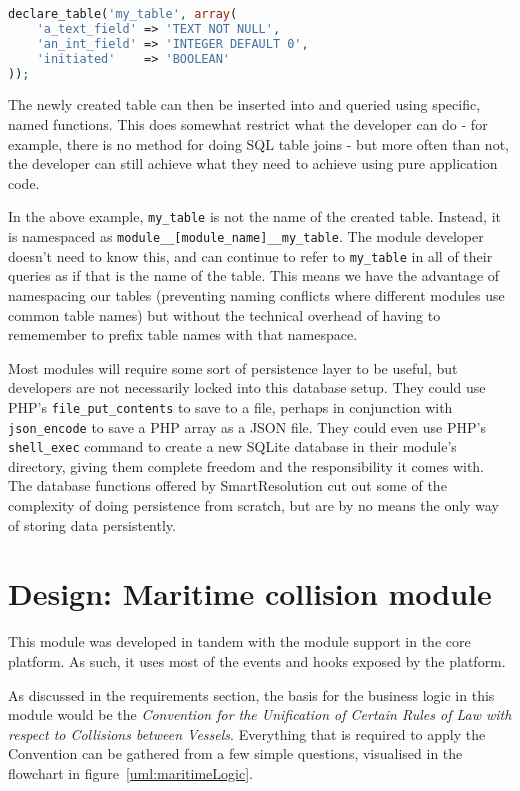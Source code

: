 \begin{lstlisting}[language=php]
declare_table('my_table', array(
    'a_text_field' => 'TEXT NOT NULL',
    'an_int_field' => 'INTEGER DEFAULT 0',
    'initiated'    => 'BOOLEAN'
));
\end{lstlisting}

The newly created table can then be inserted into and queried using specific, named functions. This does somewhat restrict what the developer can do - for example, there is no method for doing SQL table joins - but more often than not, the developer can still achieve what they need to achieve using pure application code.

In the above example, \lstinline{my_table} is not the name of the created table. Instead, it is namespaced as \lstinline{module__[module_name]__my_table}. The module developer doesn't need to know this, and can continue to refer to \lstinline{my_table} in all of their queries as if that is the name of the table. This means we have the advantage of namespacing our tables (preventing naming conflicts where different modules use common table names) but without the technical overhead of having to rememember to prefix table names with that namespace.

Most modules will require some sort of persistence layer to be useful, but developers are not necessarily locked into this database setup. They could use PHP's \lstinline{file_put_contents} to save to a file, perhaps in conjunction with \lstinline{json_encode} to save a PHP array as a JSON file. They could even use PHP's \lstinline{shell_exec} command to create a new SQLite database in their module's directory, giving them complete freedom and the responsibility it comes with. The database functions offered by SmartResolution cut out some of the complexity of doing persistence from scratch, but are by no means the only way of storing data persistently.

\section{Design: Maritime collision module}

This module was developed in tandem with the module support in the core platform. As such, it uses most of the events and hooks exposed by the platform.

As discussed in the requirements section, the basis for the business logic in this module would be the \emph{Convention for the Unification of Certain Rules of Law with respect to Collisions between Vessels}. Everything that is required to apply the Convention can be gathered from a few simple questions, visualised in the flowchart in figure~\ref{uml:maritimeLogic}.

